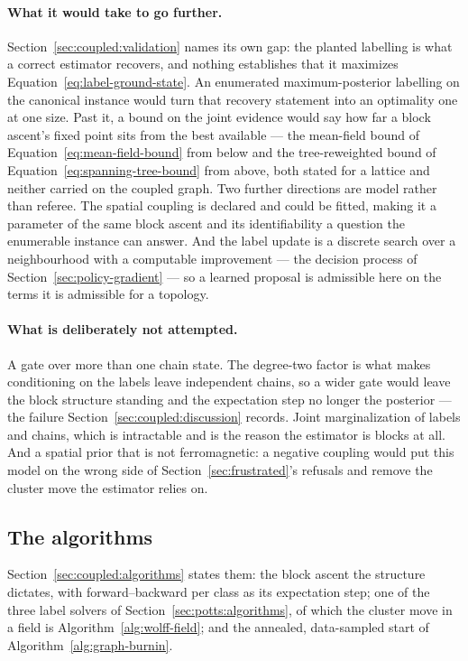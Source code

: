 \documentclass[11pt,a4paper]{article}
\begin{document}
\paragraph{What it would take to go further.}
Section~\ref{sec:coupled:validation} names its own gap: the planted labelling
is what a correct estimator recovers, and nothing establishes that it maximizes
Equation~\ref{eq:label-ground-state}. An enumerated maximum-posterior labelling
on the canonical instance would turn that recovery statement into an optimality
one at one size. Past it, a bound on the joint evidence would say how far a
block ascent's fixed point sits from the best available --- the mean-field
bound of Equation~\ref{eq:mean-field-bound} from below and the tree-reweighted
bound of Equation~\ref{eq:spanning-tree-bound} from above, both stated for a
lattice and neither carried on the coupled graph. Two further directions are
model rather than referee. The spatial coupling is declared and could be
fitted, making it a parameter of the same block ascent and its identifiability
a question the enumerable instance can answer. And the label update is a
discrete search over a neighbourhood with a computable improvement --- the
decision process of Section~\ref{sec:policy-gradient} --- so a learned proposal
is admissible here on the terms it is admissible for a topology.

\paragraph{What is deliberately not attempted.}
A gate over more than one chain state. The degree-two factor is what makes
conditioning on the labels leave independent chains, so a wider gate would
leave the block structure standing and the expectation step no longer the
posterior --- the failure
Section~\ref{sec:coupled:discussion} records. Joint marginalization of labels and chains, which is intractable and is
the reason the estimator is blocks at all. And a spatial prior that is not
ferromagnetic: a negative coupling would put this model on the wrong side of
Section~\ref{sec:frustrated}'s refusals and remove the cluster move the
estimator relies on.

\subsection{The algorithms}
Section~\ref{sec:coupled:algorithms} states them: the block
ascent the structure dictates, with forward--backward per class as its
expectation step; one of the three label solvers of
Section~\ref{sec:potts:algorithms}, of which the cluster move in a field is
Algorithm~\ref{alg:wolff-field}; and the annealed, data-sampled start of
Algorithm~\ref{alg:graph-burnin}.
\end{document}
